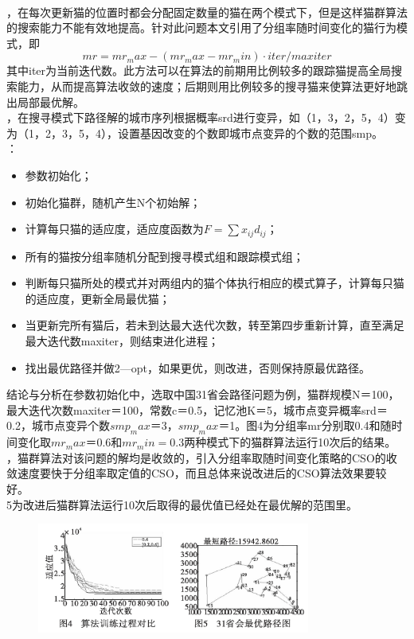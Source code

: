 \documentclass[UTF8]{ctexart}
\begin{document}
\begin{subsection}
\\ ，在每次更新猫的位置时都会分配固定数量的猫在两个模式下，但是这样猫群算法的搜索能力不能有效地提高。针对此问题本文引用了分组率随时间变化的猫行为模式，即$$mr = mr_max - (mr_max - mr_min)·iter/maxiter$$其中iter为当前迭代数。此方法可以在算法的前期用比例较多的跟踪猫提高全局搜索能力，从而提高算法收敛的速度；后期则用比例较多的搜寻猫来使算法更好地跳出局部最优解。
\\ ，在搜寻模式下路径解的城市序列根据概率srd进行变异，如（1，3，2，5，4）变为（1，2，3，5，4），设置基因改变的个数即城市点变异的个数的范围smp。
\\ ：
\begin{itemize}
	\item{参数初始化；}
	\item{初始化猫群，随机产生N个初始解；}
	\item{计算每只猫的适应度，适应度函数为$F = \sum x_{ij}d_{ij}$；}
	\item{所有的猫按分组率随机分配到搜寻模式组和跟踪模式组；}
	\item{判断每只猫所处的模式并对两组内的猫个体执行相应的模式算子，计算每只猫的适应度，更新全局最优猫；}
	\item{当更新完所有猫后，若未到达最大迭代次数，转至第四步重新计算，直至满足最大迭代数maxiter，则结束进化进程；}
	\item{找出最优路径并做2—opt，如果更优，则改进，否则保持原最优路径。}
\end{itemize}
\end{subsection}
\begin{section}
{结论与分析}在参数初始化中，选取中国31省会路径问题为例，猫群规模N＝100，最大迭代次数maxiter＝100，常数c＝0.5，记忆池K＝5，城市点变异概率srd＝0.2，城市点变异个数$smp_max$＝3，$smp_max$＝1。图4为分组率mr分别取0.4和随时间变化取$mr_max$＝0.6和$mr_min=0.3$两种模式下的猫群算法运行10次后的结果。
\\ ，猫群算法对该问题的解均是收敛的，引入分组率取随时间变化策略的CSO的收敛速度要快于分组率取定值的CSO，而且总体来说改进后的CSO算法效果要较好。
\\ 5为改进后猫群算法运行10次后取得的最优值已经处在最优解的范围里。
\begin{figure}[htbp]
	\centering
	\includegraphics[width=0.8\textwidth]{pic/cat4.png}
\end{figure}
\end{section}
\end{document}
